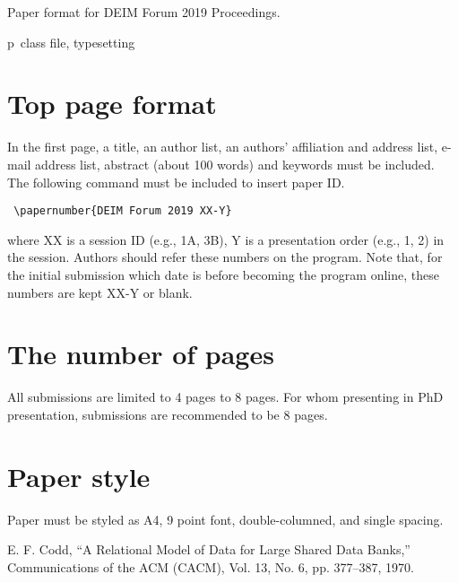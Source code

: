 \documentclass{deime}
\begin{document}
\pagestyle{empty}
\begin{eabstract}
Paper format for DEIM Forum 2019 Proceedings.
\end{eabstract}
\begin{ekeyword}
p\LaTeXe\ class file, typesetting
\end{ekeyword}
\maketitle

\section{Top page format}

In the first page, a title, an author list, an authors' affiliation and address list,
e-mail address list, abstract (about 100 words) and keywords must be included.
The following command must be included to insert paper ID.
\begin{verbatim}
 \papernumber{DEIM Forum 2019 XX-Y}
\end{verbatim}
where XX is a session ID (e.g., 1A, 3B), Y is a presentation order (e.g., 1, 2)
in the session.
Authors should refer these numbers on the program. 
Note that, for the initial submission which date is before becoming the program online,
these numbers are kept XX-Y or blank.  

\section{The number of pages}

All submissions are limited to 4 pages to 8 pages.
For whom presenting in PhD presentation, submissions are recommended to be 8 pages.

\section{Paper style}

Paper must be styled as A4, 9 point font, double-columned, and single spacing.

\vspace{2em}

\begin{thebibliography}{99}
  E. F. Codd, 
  ``A Relational Model of Data for Large Shared Data Banks,''
  Communications of the {ACM} (CACM), Vol. 13, No. 6, pp. 377--387, 1970.
\end{thebibliography}
\end{document}
